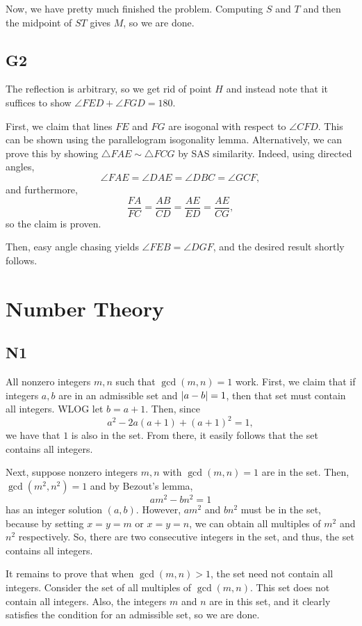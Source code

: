 \documentclass{scrartcl}
\begin{document}
Now, we have pretty much finished the problem. Computing $S$ and $T$ and then the midpoint of $ST$ gives $M$, so we are done.

\subsection*{G2}
The reflection is arbitrary, so we get rid of point $H$ and instead note that it suffices to show $\angle FED + \angle FGD = 180$.

First, we claim that lines $FE$ and $FG$ are isogonal with respect to $\angle CFD$.
This can be shown using the parallelogram isogonality lemma.
Alternatively, we can prove this by showing $\triangle FAE \sim \triangle FCG$ by SAS similarity.
Indeed, using directed angles,
\[ \angle FAE = \angle DAE = \angle DBC = \angle GCF, \]
and furthermore,
\[ \frac{FA}{FC} = \frac{AB}{CD} = \frac{AE}{ED} = \frac{AE}{CG}, \]
so the claim is proven.

Then, easy angle chasing yields $\angle FEB = \angle DGF$, and the desired result shortly follows.


\section*{Number Theory}
\subsection*{N1}
All nonzero integers $m,n$ such that $\gcd(m,n) = 1$ work.
First, we claim that if integers $a,b$ are in an admissible set and $\left\lvert a-b \right\rvert = 1$, then that set must contain all integers.
WLOG let $b = a+1$. Then, since
\[ a^2 - 2a(a+1) + (a+1)^2 = 1, \]
we have that $1$ is also in the set.
From there, it easily follows that the set contains all integers.

Next, suppose nonzero integers $m,n$ with $\gcd(m,n) = 1$ are in the set.
Then, $\gcd(m^2, n^2) = 1$ and by Bezout's lemma,
\[ am^2 - bn^2 = 1 \]
has an integer solution $(a,b)$.
However, $am^2$ and $bn^2$ must be in the set, because by setting $x = y = m$ or $x = y = n$, we can obtain all multiples of $m^2$ and $n^2$ respectively.
So, there are two consecutive integers in the set, and thus, the set contains all integers.

It remains to prove that when $\gcd(m,n) > 1$, the set need not contain all integers.
Consider the set of all multiples of $\gcd(m,n)$.
This set does not contain all integers.
Also, the integers $m$ and $n$ are in this set, and it clearly satisfies the condition for an admissible set, so we are done.
\end{document}
